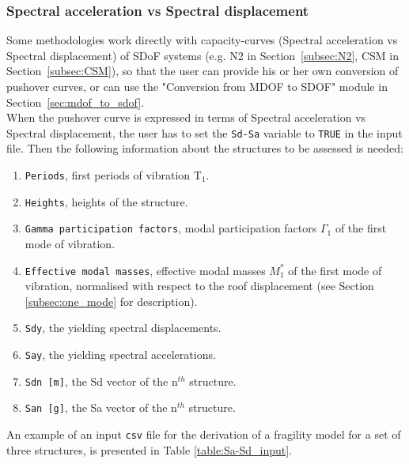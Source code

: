 \subsubsection{Spectral acceleration vs Spectral displacement}
\label{subsubsec:Sa-Sd}
Some methodologies work directly with capacity-curves (Spectral acceleration vs Spectral displacement) of SDoF systems (e.g. N2 in Section~\ref{subsec:N2}, CSM in Section~\ref{subsec:CSM}), so that the user can provide his or her own conversion of pushover curves, or can use the "Conversion from MDOF to SDOF" module in Section~\ref{sec:mdof_to_sdof}.\\
When the pushover curve is expressed in terms of Spectral acceleration vs Spectral displacement, the user has to set the \verb=Sd-Sa= variable to \verb=TRUE= in the input file. Then the following information about the structures to be assessed is needed:\\

\begin{enumerate}
\item \verb=Periods=, first periods of vibration T$_1$.
\item \verb=Heights=, heights of the structure.
\item \verb=Gamma participation factors=, modal participation factors $\Gamma_1$ of the first mode of vibration.
\item \verb=Effective modal masses=, effective modal masses $M_{1}^{*}$ of the first mode of vibration, normalised with respect to the roof displacement (see Section \ref{subsec:one_mode} for description).
\item \verb=Sdy=, the yielding spectral displacements.
\item \verb=Say=, the yielding spectral accelerations.
\item \verb=Sdn [m]=, the Sd vector of the n$^{th}$ structure.
\item \verb=San [g]=, the Sa vector of the n$^{th}$ structure. \\
\end{enumerate}

An example of an input \verb=csv= file for the derivation of a fragility model for a set of three structures, is presented in Table \ref{table:Sa-Sd_input}.

